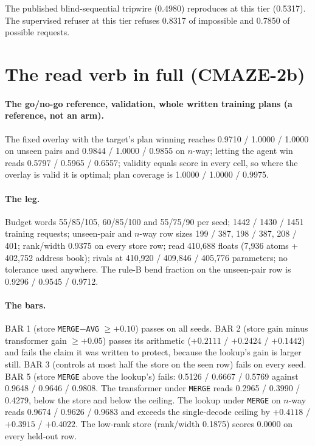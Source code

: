 \documentclass{article} %
\begin{document}
\noindent The published blind-sequential tripwire (0.4980) reproduces at this tier (0.5317). The
supervised refuser at this tier refuses 0.8317 of impossible and 0.7850 of possible requests.

\section{The read verb in full (CMAZE-2b)}
\label{app:verb}

\paragraph{The go/no-go reference, validation, whole written training plans (a reference, not an
arm).} The fixed overlay with the target's plan winning reaches 0.9710 / 1.0000 / 1.0000 on unseen
pairs and 0.9844 / 1.0000 / 0.9855 on $n$-way; letting the agent win reads 0.5797 / 0.5965 / 0.6557;
validity equals score in every cell, so where the overlay is valid it is optimal; plan coverage is
1.0000 / 1.0000 / 0.9975. %

\paragraph{The leg.} Budget words 55/85/105, 60/85/100 and 55/75/90 per seed; 1442 / 1430 / 1451
training requests; unseen-pair and $n$-way row sizes 199 / 387, 198 / 387, 208 / 401; rank/width
0.9375 on every store row; read 410,688 floats (7,936 atoms + 402,752 address book); rivals at
410,920 / 409,846 / 405,776 parameters; no tolerance used anywhere. The rule-B bend fraction on the
unseen-pair row is 0.9296 / 0.9545 / 0.9712. %

\paragraph{The bars.} BAR 1 (store \texttt{MERGE}$-$\texttt{AVG} $\ge+0.10$) passes on all seeds.
BAR 2 (store gain minus transformer gain $\ge+0.05$) passes its arithmetic ($+0.2111$ / $+0.2424$
/ $+0.1442$) and fails the claim it was written to protect, because the lookup's gain is larger
still. BAR 3 (controls at most half the store on the seen row) fails on every seed. BAR 5 (store
\texttt{MERGE} above the lookup's) fails: 0.5126 / 0.6667 / 0.5769 against 0.9648 / 0.9646 /
0.9808. The transformer under \texttt{MERGE} reads 0.2965 / 0.3990 / 0.4279, below the store and
below the ceiling. The lookup under \texttt{MERGE} on $n$-way reads 0.9674 / 0.9626 / 0.9683 and
exceeds the single-decode ceiling by $+0.4118$ / $+0.3915$ / $+0.4022$. The low-rank store
(rank/width 0.1875) scores 0.0000 on every held-out row. %
\end{document}
